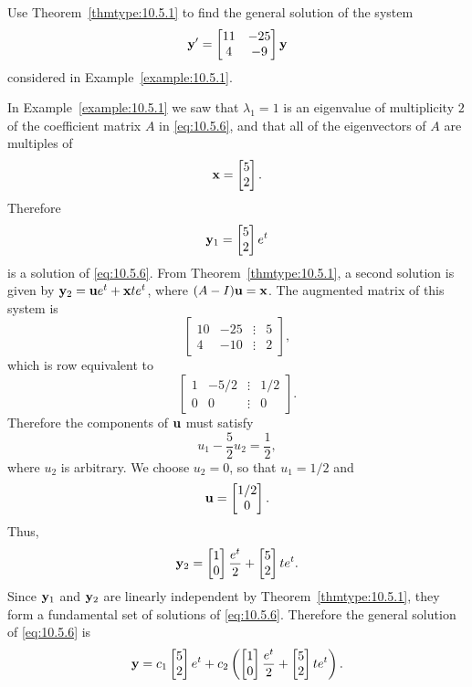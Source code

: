 \documentclass{ximera}
\begin{document}
\begin{example}\label{example:10.5.2}
Use Theorem~\ref{thmtype:10.5.1} to find the general solution of the system
\begin{equation}\label{eq:10.5.6}
{\bf y}'=\begin{bmatrix}11&-25\\4&-9\end{bmatrix}{\bf y}
\end{equation}
considered in Example~\ref{example:10.5.1}.

\begin{explanation} 
In Example~\ref{example:10.5.1} we saw that $\lambda_1=1$ is an
eigenvalue of multiplicity $2$ of the coefficient matrix $A$ in
\eqref{eq:10.5.6}, and that all of the eigenvectors of $A$ are multiples of
$$
{\bf x}=\begin{bmatrix}5\\2\end{bmatrix}.
$$
Therefore
$$
{\bf y}_1=\begin{bmatrix}5\\2\end{bmatrix}e^t
$$
is a solution of \eqref{eq:10.5.6}. From Theorem~\ref{thmtype:10.5.1}, a second
solution is given by ${\bf y}_2={\bf u}e^t+{\bf x}te^t$, where
$(A-I){\bf u}={\bf x}$. The augmented matrix of this system is
$$
\begin{bmatrix}10&-25&\vdots&5\\4&-10&\vdots&2\end{bmatrix},
$$
which is row equivalent to
$$
\begin{bmatrix}1&-5/2&\vdots&1/2\\
0&0&\vdots&0\end{bmatrix}.
$$
Therefore the components of ${\bf u}$ must satisfy
$$
u_1-\frac{5}{2}u_2=\frac{1}{2},
$$
where  $u_2$ is arbitrary. We choose $u_2=0$, so that $u_1=1/2$ and
$$
{\bf u}=\begin{bmatrix}1/2\\0\end{bmatrix}.
$$
Thus,
$$
{\bf y}_2=\begin{bmatrix}1\\0\end{bmatrix}\frac{e^t}{2}+\begin{bmatrix}5\\2\end{bmatrix}te^t.
$$
Since ${\bf y}_1$ and ${\bf y}_2$ are linearly independent by
Theorem~\ref{thmtype:10.5.1}, they form a fundamental set of solutions of
\eqref{eq:10.5.6}. Therefore the general solution of \eqref{eq:10.5.6} is
$$
{\bf
y}=c_1\begin{bmatrix}5\\2\end{bmatrix}e^t+c_2\left(\begin{bmatrix}1\\0\end{bmatrix}\frac{e^t}{2}+\begin{bmatrix}5\\2\end{bmatrix}te^t\right).
$$
\end{explanation}
\end{example}
\end{document}
